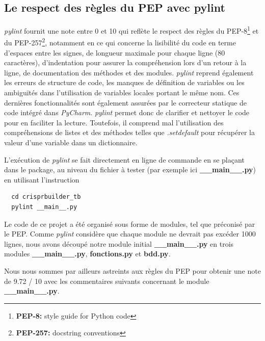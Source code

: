 \documentclass[twoside,a4paper,11pt,frenchb,openany]{report}
\begin{document}
\subsection{Le respect des règles du PEP avec pylint}

\textit{pylint} fournit une note entre 0 et 10 qui reflète le respect des règles du PEP-8\footnote{\textbf{PEP-8:} style guide for Python code} et du PEP-257\footnote{\textbf{PEP-257:} docstring conventions}, notamment en ce qui concerne la lisibilité du code en terme d'espaces entre les signes, de longueur maximale pour chaque ligne (80 caractères), d'indentation pour assurer la compréhension lors d'un retour à la ligne, de documentation des méthodes et des modules. \textit{pylint} reprend également les erreurs de structure de code, les manques de définition de variables ou les ambiguïtés dans l'utilisation de variables locales portant le même nom. Ces dernières fonctionnalités sont également assurées par le correcteur statique de code intégré dans \textit{PyCharm}. \textit{pylint} permet donc de clarifier et nettoyer le code pour en faciliter la lecture. Toutefois, il comprend mal l'utilisation des compréhensions de listes et des méthodes telles que \textit{.setdefault} pour récupérer la valeur d'une variable dans un dictionnaire. 

L'exécution de \textit{pylint} se fait directement en ligne de commande en se plaçant dans le package, au niveau du fichier à tester (par exemple ici \textbf{\_\_main\_\_.py}) en utilisant l'instruction

\begin{verbatim}  cd crisprbuilder_tb
  pylint __main__.py
\end{verbatim}

Le code de ce projet a été organisé sous forme de modules, tel que préconisé par le PEP. Comme \textit{pylint} considère que chaque module ne devrait pas excéder 1000 lignes, nous avons découpé notre module initial \textbf{\_\_main\_\_.py} en trois modules \textbf{\_\_main\_\_.py}, \textbf{fonctions.py} et \textbf{bdd.py}.

Nous nous sommes par ailleurs astreints aux règles du PEP pour obtenir une note de 9.72 / 10 avec les commentaires suivants concernant le module \textbf{\_\_main\_\_.py}. 
\end{document}
